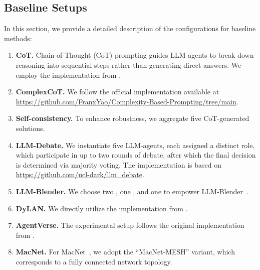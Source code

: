 \documentclass{article}
\theoremstyle{plain}
\theoremstyle{definition}
\theoremstyle{remark}
\newcommand{\llmname}[1]{{\fontfamily{pcr}\selectfont {#1}}\xspace}
\begin{document}
\subsection{Baseline Setups}\label{app:baselines}




In this section, we provide a detailed description of the configurations for baseline methods:  

\begin{enumerate}  
    \item \textbf{CoT.} Chain-of-Thought (CoT) prompting guides LLM agents to break down reasoning into sequential steps rather than generating direct answers. We employ the implementation from \cite{zhang2022automaticcot}.  

    \item \textbf{ComplexCoT.} We follow the official implementation available at \url{https://github.com/FranxYao/Complexity-Based-Prompting/tree/main}.  

    \item \textbf{Self-consistency.} To enhance robustness, we aggregate five CoT-generated solutions.  

    \item \textbf{LLM-Debate.} We instantiate five LLM-agents, each assigned a distinct role, which participate in up to two rounds of debate, after which the final decision is determined via majority voting. The implementation is based on \url{https://github.com/ucl-dark/llm_debate}.  

    \item \textbf{LLM-Blender.} We choose two \llmname{gpt-4o-mini}, one \llmname{Qwen-2.5-72b}, and one \llmname{llama-3.1-70b} to empower LLM-Blender~\cite{blender}.  

    \item \textbf{DyLAN.} We directly utilize the implementation from \cite{arXiv2023_Dynamic-LLM-Agent}.  

    \item \textbf{AgentVerse.} The experimental setup follows the original implementation from \cite{chen2023agentverse}.  

    \item \textbf{MacNet.} For MacNet~\citep{qian2024scaling}, we adopt the ``MacNet-MESH'' variant, which corresponds to a fully connected network topology.  


\end{enumerate}
\end{document}
